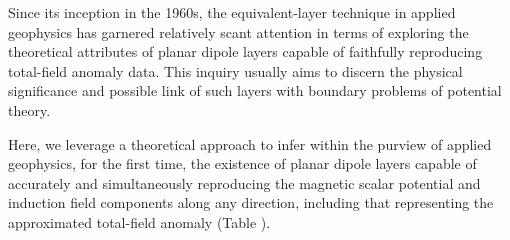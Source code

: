Since its inception in the 1960s, the equivalent-layer technique in applied geophysics has garnered 
relatively scant attention in terms of exploring the theoretical attributes of planar dipole layers 
capable of faithfully reproducing total-field anomaly data. 
This inquiry usually aims to discern the physical significance and possible link of such layers 
with boundary problems of potential theory.

Here, we leverage a theoretical approach to infer within the purview of applied geophysics, 
for the first time, the existence of planar dipole layers capable of accurately and simultaneously reproducing 
the magnetic scalar potential and induction field components along any direction, including that representing 
the approximated total-field anomaly (Table ).

